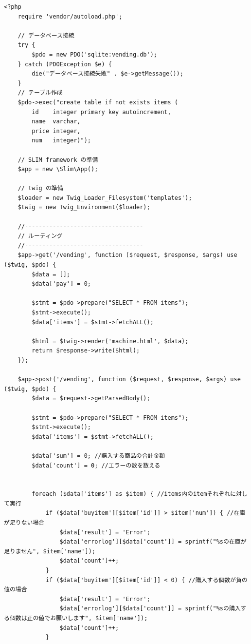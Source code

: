 \documentclass[12pt]{jarticle}
\begin{document}
\clearpage
\begin{lstlisting}[style = lstphp,caption=課題2のindex.php]
    <?php
    require 'vendor/autoload.php';
    
    // データベース接続
    try {
        $pdo = new PDO('sqlite:vending.db');
    } catch (PDOException $e) {
        die("データベース接続失敗" . $e->getMessage());
    }
    // テーブル作成
    $pdo->exec("create table if not exists items (
        id    integer primary key autoincrement,
        name  varchar,
        price integer,
        num   integer)");
    
    // SLIM framework の準備
    $app = new \Slim\App();
    
    // twig の準備
    $loader = new Twig_Loader_Filesystem('templates');
    $twig = new Twig_Environment($loader);
    
    //----------------------------------
    // ルーティング
    //----------------------------------
    $app->get('/vending', function ($request, $response, $args) use ($twig, $pdo) {
        $data = [];
        $data['pay'] = 0;
    
        $stmt = $pdo->prepare("SELECT * FROM items");
        $stmt->execute();
        $data['items'] = $stmt->fetchALL();
    
        $html = $twig->render('machine.html', $data);
        return $response->write($html);
    });
    
    $app->post('/vending', function ($request, $response, $args) use ($twig, $pdo) {
        $data = $request->getParsedBody();
    
        $stmt = $pdo->prepare("SELECT * FROM items");
        $stmt->execute();
        $data['items'] = $stmt->fetchALL();
    
        $data['sum'] = 0; //購入する商品の合計金額
        $data['count'] = 0; //エラーの数を数える
    
    
        foreach ($data['items'] as $item) { //items内のitemそれぞれに対して実行
            if ($data['buyitem'][$item['id']] > $item['num']) { //在庫が足りない場合
                $data['result'] = 'Error';
                $data['errorlog'][$data['count']] = sprintf("%sの在庫が足りません", $item['name']);
                $data['count']++;
            }
            if ($data['buyitem'][$item['id']] < 0) { //購入する個数が負の値の場合
                $data['result'] = 'Error';
                $data['errorlog'][$data['count']] = sprintf("%sの購入する個数は正の値でお願いします", $item['name']);
                $data['count']++;
            }
    

\end{lstlisting}
\end{document}
